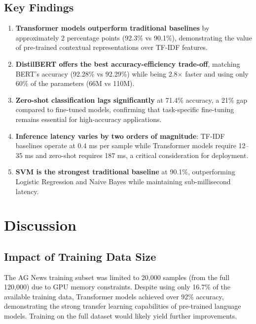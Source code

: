 \documentclass[12pt, a4paper]{article}
\begin{document}
\subsection{Key Findings}
\begin{enumerate}
    \item \textbf{Transformer models outperform traditional baselines} by approximately 2 percentage points (92.3\% vs 90.1\%), demonstrating the value of pre-trained contextual representations over TF-IDF features.
    \item \textbf{DistilBERT offers the best accuracy-efficiency trade-off}, matching BERT's accuracy (92.28\% vs 92.29\%) while being 2.8$\times$ faster and using only 60\% of the parameters (66M vs 110M).
    \item \textbf{Zero-shot classification lags significantly} at 71.4\% accuracy, a 21\% gap compared to fine-tuned models, confirming that task-specific fine-tuning remains essential for high-accuracy applications.
    \item \textbf{Inference latency varies by two orders of magnitude}: TF-IDF baselines operate at 0.4 ms per sample while Transformer models require 12--35 ms and zero-shot requires 187 ms, a critical consideration for deployment.
    \item \textbf{SVM is the strongest traditional baseline} at 90.1\%, outperforming Logistic Regression and Naive Bayes while maintaining sub-millisecond latency.
\end{enumerate}

\section{Discussion}

\subsection{Impact of Training Data Size}
The AG News training subset was limited to 20,000 samples (from the full 120,000) due to GPU memory constraints. Despite using only 16.7\% of the available training data, Transformer models achieved over 92\% accuracy, demonstrating the strong transfer learning capabilities of pre-trained language models. Training on the full dataset would likely yield further improvements.
\end{document}
